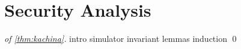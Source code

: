\section{Security Analysis}
\label{sec:fullproof}

\begin{proof}[of \autoref{thm:kachina}]
{intro}
{simulator}
{invariant}
{lemmas}
{induction}
\qed
\end{proof}


